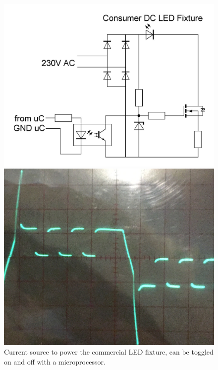 
	\begin{figure}[!tbp]
	  \centering
	  \begin{minipage}[b]{0.49\textwidth}
	    \includegraphics[width=\textwidth]{chapters/hardware-chapters/custom-modulator-current-source.JPG}
		\caption{Current source to power the commercial LED fixture, can be toggled on and off with a microprocessor.}
		\label{fig:custom-modulator-current-source}
	  \end{minipage}
	  \hfill
	  \begin{minipage}[b]{0.49\textwidth}
	    \includegraphics[width=\textwidth]{chapters/hardware-chapters/current-source-measurement-cropped.png}

\end{minipage}
\end{figure}
